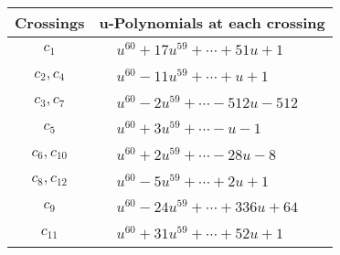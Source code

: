 \documentclass[1p]{elsarticle_modified}
\theoremstyle{definition}
\begin{document}
\begin{tabular}{m{50pt}|m{274pt}}
Crossings & \hspace{64pt}u-Polynomials at each crossing \\
\hline $$\begin{aligned}c_{1}\end{aligned}$$&$\begin{aligned}
&u^{60}+17 u^{59}+\cdots+51 u+1
\end{aligned}$\\
\hline $$\begin{aligned}c_{2},c_{4}\end{aligned}$$&$\begin{aligned}
&u^{60}-11 u^{59}+\cdots+u+1
\end{aligned}$\\
\hline $$\begin{aligned}c_{3},c_{7}\end{aligned}$$&$\begin{aligned}
&u^{60}-2 u^{59}+\cdots-512 u-512
\end{aligned}$\\
\hline $$\begin{aligned}c_{5}\end{aligned}$$&$\begin{aligned}
&u^{60}+3 u^{59}+\cdots- u-1
\end{aligned}$\\
\hline $$\begin{aligned}c_{6},c_{10}\end{aligned}$$&$\begin{aligned}
&u^{60}+2 u^{59}+\cdots-28 u-8
\end{aligned}$\\
\hline $$\begin{aligned}c_{8},c_{12}\end{aligned}$$&$\begin{aligned}
&u^{60}-5 u^{59}+\cdots+2 u+1
\end{aligned}$\\
\hline $$\begin{aligned}c_{9}\end{aligned}$$&$\begin{aligned}
&u^{60}-24 u^{59}+\cdots+336 u+64
\end{aligned}$\\
\hline $$\begin{aligned}c_{11}\end{aligned}$$&$\begin{aligned}
&u^{60}+31 u^{59}+\cdots+52 u+1
\end{aligned}$\\
\hline
\end{tabular}\\~\\
\end{document}
